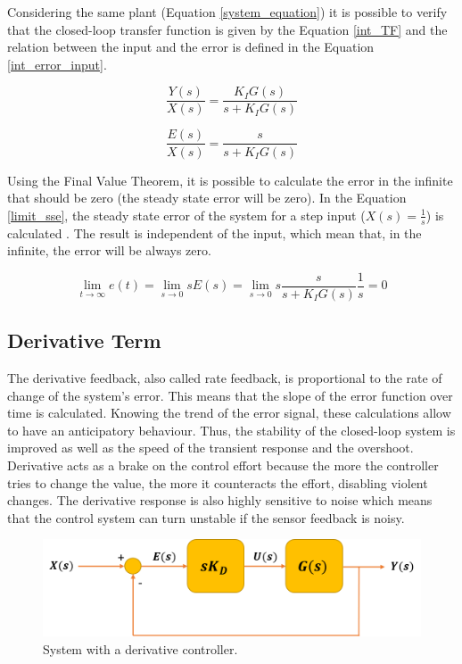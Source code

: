 Considering the same plant (Equation \ref{system_equation}) it is possible to verify that the closed-loop transfer function is given by the Equation \ref{int_TF} and the relation between the input and the error is defined in the Equation \ref{int_error_input}.

\begin{equation}\label{int_TF}
\frac{Y(s)}{X(s)}= \frac{K_IG(s)}{s + K_IG(s)}
\end{equation}

\begin{equation}\label{int_error_input}
\frac{E(s)}{X(s)}= \frac{s}{s + K_IG(s)}
\end{equation}

Using the Final Value Theorem, it is possible to calculate the error in the infinite that should be zero (the steady state error will be zero). In the Equation \ref{limit_sse}, the steady state error of the system for a step input ($X(s)=\frac{1}{s}$) is calculated . The result is independent of the input, which mean that, in the infinite, the error will be always zero.

\begin{equation}\label{limit_sse}
\lim_{t\to\infty} e(t) = \lim_{s \to 0} sE(s) = \lim_{s \to 0} s\frac{s}{s + K_IG(s)}\frac{1}{s} = 0
\end{equation}

\subsection*{Derivative Term}

The derivative feedback, also called rate feedback, is proportional to the rate of change of the system's error. This means that the slope of the error function over time is calculated. Knowing the trend of the error signal, these calculations allow to have an anticipatory behaviour. Thus, the stability of the closed-loop system is improved as well as the speed of the transient response and the overshoot. Derivative acts as a brake on the control effort because the more the controller tries to change the value, the more it counteracts the effort, disabling violent changes. The derivative response is also highly sensitive to noise which means that the control system can turn unstable if the sensor feedback is noisy. 

\begin{figure}[H]
	\centering
	\includegraphics[scale=0.6]{figures/deriv_controller.png}
	\caption{System with a derivative controller.}
	\label{deriv_controller}
\end{figure}

